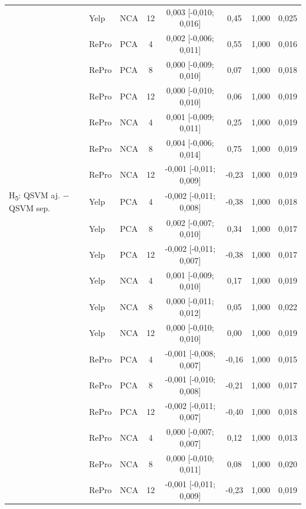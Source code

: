 \begin{table}[t]
\begin{tabular}{lllccccc}
 & Yelp & NCA & 12 & 0,003 [-0,010; 0,016] & 0,45 & 1,000 & 0,025 \\
 & RePro & PCA & 4 & 0,002 [-0,006; 0,011] & 0,55 & 1,000 & 0,016 \\
 & RePro & PCA & 8 & 0,000 [-0,009; 0,010] & 0,07 & 1,000 & 0,018 \\
 & RePro & PCA & 12 & 0,000 [-0,010; 0,010] & 0,06 & 1,000 & 0,019 \\
 & RePro & NCA & 4 & 0,001 [-0,009; 0,011] & 0,25 & 1,000 & 0,019 \\
 & RePro & NCA & 8 & 0,004 [-0,006; 0,014] & 0,75 & 1,000 & 0,019 \\
 & RePro & NCA & 12 & -0,001 [-0,011; 0,009] & -0,23 & 1,000 & 0,019 \\
\midrule
H\textsubscript{5}: QSVM aj. $-$ QSVM sep. & Yelp & PCA & 4 & -0,002 [-0,011; 0,008] & -0,38 & 1,000 & 0,018 \\
 & Yelp & PCA & 8 & 0,002 [-0,007; 0,010] & 0,34 & 1,000 & 0,017 \\
 & Yelp & PCA & 12 & -0,002 [-0,011; 0,007] & -0,38 & 1,000 & 0,017 \\
 & Yelp & NCA & 4 & 0,001 [-0,009; 0,010] & 0,17 & 1,000 & 0,019 \\
 & Yelp & NCA & 8 & 0,000 [-0,011; 0,012] & 0,05 & 1,000 & 0,022 \\
 & Yelp & NCA & 12 & 0,000 [-0,010; 0,010] & 0,00 & 1,000 & 0,019 \\
 & RePro & PCA & 4 & -0,001 [-0,008; 0,007] & -0,16 & 1,000 & 0,015 \\
 & RePro & PCA & 8 & -0,001 [-0,010; 0,008] & -0,21 & 1,000 & 0,017 \\
 & RePro & PCA & 12 & -0,002 [-0,011; 0,007] & -0,40 & 1,000 & 0,018 \\
 & RePro & NCA & 4 & 0,000 [-0,007; 0,007] & 0,12 & 1,000 & 0,013 \\
 & RePro & NCA & 8 & 0,000 [-0,010; 0,011] & 0,08 & 1,000 & 0,020 \\
 & RePro & NCA & 12 & -0,001 [-0,011; 0,009] & -0,23 & 1,000 & 0,019 \\
\bottomrule
\end{tabular}
\end{table}